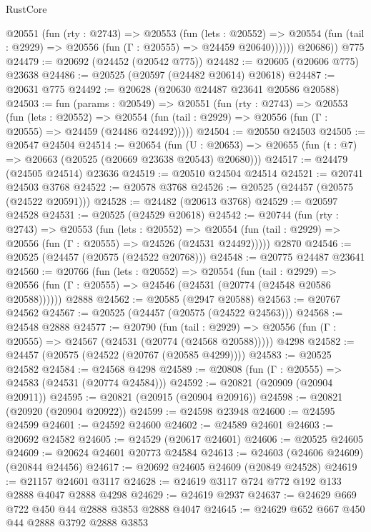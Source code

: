 \begin{lexlean}{RustCore}
\begin{coremodule}
          @20551
            (fun (rty : @2743) =>
            @20553
              (fun (lets : @20552) =>
              @20554 (fun (tail : @2929) => @20556 (fun (Γ : @20555) => @24459 @20640))))))
        @20686))
    @775
@24479 := @20692 (@24452 (@20542 @775))
@24482 := @20605 (@20606 @775) @23638
@24486 := @20525 (@20597 (@24482 @20614) @20618)
@24487 := @20631 @775
@24492 := @20628 (@20630 @24487 @23641 @20586 @20588)
@24503 := fun (params : @20549) =>
  @20551
    (fun (rty : @2743) =>
    @20553
      (fun (lets : @20552) =>
      @20554 (fun (tail : @2929) => @20556 (fun (Γ : @20555) => @24459 (@24486 @24492)))))
@24504 := @20550 @24503
@24505 := @20547 @24504
@24514 := @20654
    (fun (U : @20653) => @20655 (fun (t : @7) => @20663 (@20525 (@20669 @23638 @20543) @20680)))
@24517 := @24479 (@24505 @24514) @23636
@24519 := @20510 @24504 @24514
@24521 := @20741 @24503 @3768
@24522 := @20578 @3768
@24526 := @20525 (@24457 (@20575 (@24522 @20591)))
@24528 := @24482 (@20613 @3768)
@24529 := @20597 @24528
@24531 := @20525 (@24529 @20618)
@24542 := @20744
    (fun (rty : @2743) =>
    @20553
      (fun (lets : @20552) =>
      @20554 (fun (tail : @2929) => @20556 (fun (Γ : @20555) => @24526 (@24531 @24492)))))
    @2870
@24546 := @20525 (@24457 (@20575 (@24522 @20768)))
@24548 := @20775 @24487 @23641
@24560 := @20766
    (fun (lets : @20552) =>
    @20554
      (fun (tail : @2929) =>
      @20556 (fun (Γ : @20555) => @24546 (@24531 (@20774 (@24548 @20586 @20588))))))
    @2888
@24562 := @20585 (@2947 @20588)
@24563 := @20767 @24562
@24567 := @20525 (@24457 (@20575 (@24522 @24563)))
@24568 := @24548 @2888
@24577 := @20790
    (fun (tail : @2929) => @20556 (fun (Γ : @20555) => @24567 (@24531 (@20774 (@24568 @20588)))))
    @4298
@24582 := @24457 (@20575 (@24522 (@20767 (@20585 @4299))))
@24583 := @20525 @24582
@24584 := @24568 @4298
@24589 := @20808 (fun (Γ : @20555) => @24583 (@24531 (@20774 @24584)))
@24592 := @20821 (@20909 (@20904 @20911))
@24595 := @20821 (@20915 (@20904 @20916))
@24598 := @20821 (@20920 (@20904 @20922))
@24599 := @24598 @23948
@24600 := @24595 @24599
@24601 := @24592 @24600
@24602 := @24589 @24601
@24603 := @20692 @24582
@24605 := @24529 (@20617 @24601)
@24606 := @20525 @24605
@24609 := @20624 @24601 @20773 @24584
@24613 := @24603 (@24606 @24609) (@20844 @24456)
@24617 := @20692 @24605 @24609 (@20849 @24528)
@24619 := @21157 @24601 @3117
@24628 := @24619 @3117 @724 @772 @192 @133 @2888 @4047 @2888 @4298
@24629 := @24619 @2937
@24637 := @24629 @669 @722 @450 @44 @2888 @3853 @2888 @4047
@24645 := @24629 @652 @667 @450 @44 @2888 @3792 @2888 @3853

\end{coremodule}
\end{lexlean}
